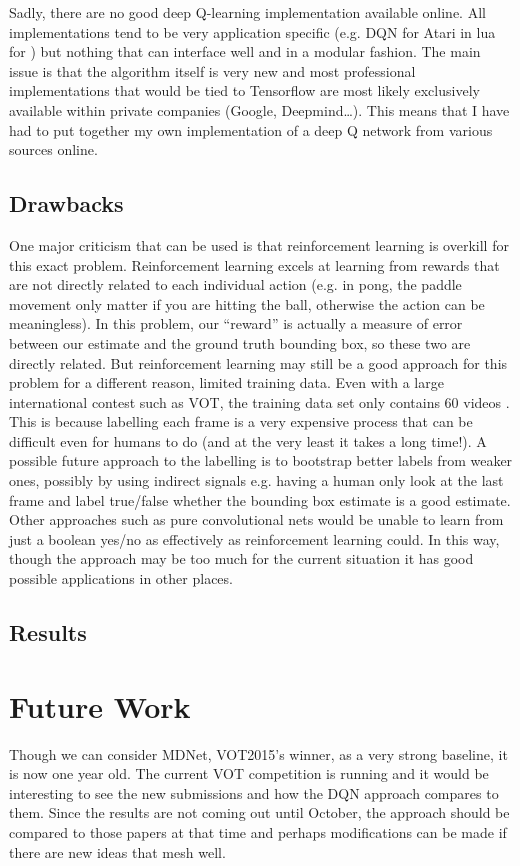 \documentclass[letterpaper,12pt,titlepage,oneside,final]{book}
\begin{document}
Sadly, there are no good deep Q-learning implementation available online. All implementations tend to be very application specific (e.g. DQN for Atari in lua for \cite{atari-dqn}) but nothing that can interface well and in a modular fashion. The main issue is that the algorithm itself is very new and most professional implementations that would be tied to Tensorflow are most likely exclusively available within private companies (Google, Deepmind\dots). This means that I have had to put together my own implementation of a deep Q network from various sources online.

\section{Drawbacks}
One major criticism that can be used is that reinforcement learning is overkill for this exact problem. Reinforcement learning excels at learning from rewards that are not directly related to each individual action (e.g. in pong, the paddle movement only matter if you are hitting the ball, otherwise the action can be meaningless). In this problem, our ``reward'' is actually a measure of error between our estimate and the ground truth bounding box, so these two are directly related. But reinforcement learning may still be a good approach for this problem for a different reason, limited training data. Even with a large international contest such as VOT, the training data set only contains 60 videos \cite{vot2015}. This is because labelling each frame is a very expensive process that can be difficult even for humans to do (and at the very least it takes a long time!). A possible future approach to the labelling is to bootstrap better labels from weaker ones, possibly by using indirect signals e.g. having a human only look at the last frame and label true/false whether the bounding box estimate is a good estimate. Other approaches such as pure convolutional nets would be unable to learn from just a boolean yes/no as effectively as reinforcement learning could. In this way, though the approach may be too much for the current situation it has good possible applications in other places.

\section{Results}

\chapter{Future Work}
Though we can consider MDNet, VOT2015's winner, as a very strong baseline, it is now one year old. The current VOT competition is running and it would be interesting to see the new submissions and how the DQN approach compares to them. Since the results are not coming out until October, the approach should be compared to those papers at that time and perhaps modifications can be made if there are new ideas that mesh well.
\end{document}
